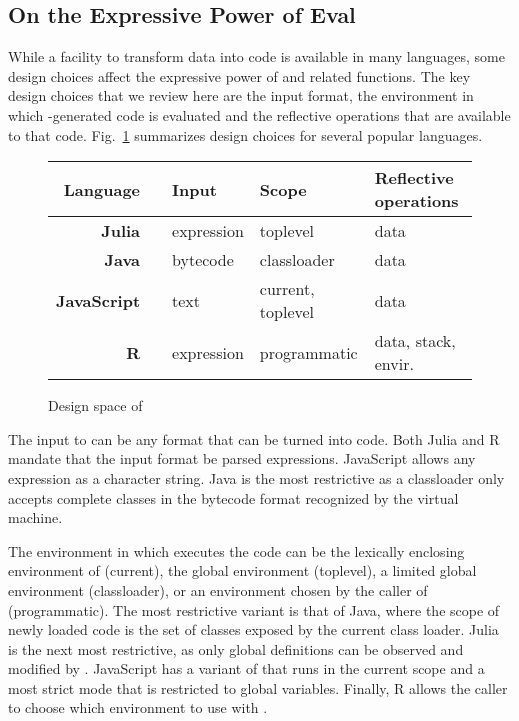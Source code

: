 \documentclass[screen,acmsmall]{acmart}
\begin{document}
\subsection{On the Expressive Power of Eval}

While a facility to transform data into code is available in many languages,
some design choices affect the expressive power of \eval and related functions.
The key design choices that we review here are the input format, the environment
in which \eval-generated code is evaluated and the reflective operations that
are available to that code. Fig.~\ref{comp} summarizes design choices for
several popular languages.

\begin{figure}[!t]\center\small
\begin{tabular}{r@{~}l|l|l|l}\hline
\tiny\sc Language&&\sc\tiny Input&\sc\tiny Scope&\tiny\sc Reflective operations\\\hline
\bf Julia&\cite{julia}     & expression& toplevel         & data\\
\bf Java&\cite{cl}  & bytecode  & classloader       & data\\
\bf JavaScript&\cite{ecoop11}& text      & current, toplevel& data\\
\bf R&\cite{R96}  & expression& programmatic      & data, stack, envir.\\\hline
\end{tabular}
\caption{Design space of \eval}\label{comp}
\end{figure}

The input to \eval can be any format that can be turned into code. Both Julia
and R mandate that the input format be parsed expressions. JavaScript allows any
expression as a character string. Java is the most restrictive as a classloader
only accepts complete classes in the bytecode format recognized by the virtual
machine.

The environment in which \eval executes the code can be the lexically enclosing
environment of \eval (current), the global environment (toplevel), a limited
global environment (classloader), or an environment chosen by the caller of
\eval (programmatic). The most restrictive variant is that of Java, where the
scope of newly loaded code is the set of classes exposed by the current class
loader. Julia is the next most restrictive, as only global definitions can be
observed and modified by \eval. JavaScript has a variant of \eval that runs in
the current scope and a most strict mode that is restricted to global variables.
Finally, R allows the caller to choose which environment to use with \eval.
\end{document}
